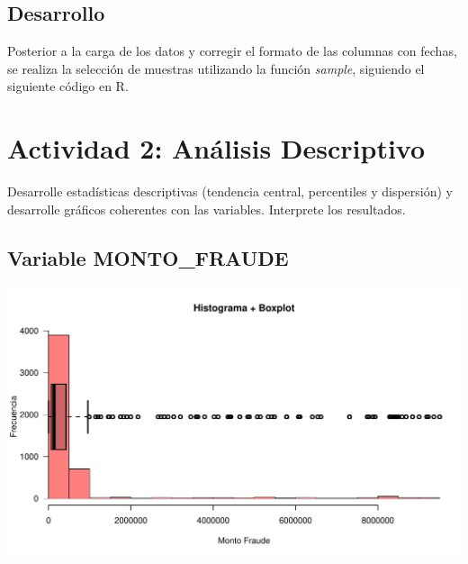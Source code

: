 \documentclass[
	11pt, %
	spanish, %
]{fphw}
\begin{document}

\subsection*{Desarrollo}
Posterior a la carga de los datos y corregir el formato de las columnas con fechas, se realiza la selección de muestras utilizando la función \textit{sample}, siguiendo el siguiente código en R. 






\newpage
\section*{Actividad 2: Análisis Descriptivo}

\begin{problem}
	Desarrolle estadísticas descriptivas (tendencia central, percentiles y dispersión) y desarrolle gráficos coherentes con las variables. Interprete los resultados.
\end{problem}


\subsection*{Variable MONTO\_FRAUDE}

\begin{center}
	\includegraphics[width=15cm]{Hist1.pdf} %
\end{center}
\end{document}
